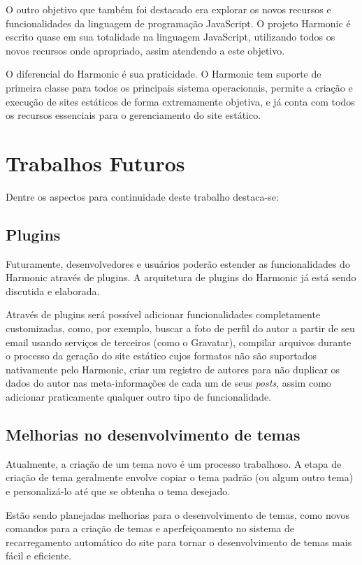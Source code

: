 \documentclass[ppginf, pep]{esinucpel}
\begin{document}
O outro objetivo que também foi destacado era explorar os novos recursos e funcionalidades da linguagem de programação JavaScript. O projeto Harmonic é escrito quase em sua totalidade na linguagem JavaScript, utilizando todos os novos recursos onde apropriado, assim atendendo a este objetivo.

O diferencial do Harmonic é sua praticidade. O Harmonic tem suporte de primeira classe para todos os principais sistema operacionais, permite a criação e execução de sites estáticos de forma extremamente objetiva, e já conta com todos os recursos essenciais para o gerenciamento do site estático.

\section{Trabalhos Futuros}

Dentre os aspectos para continuidade deste trabalho destaca-se: 

\subsection{Plugins}

Futuramente, desenvolvedores e usuários poderão estender as funcionalidades do Harmonic através de plugins. A arquitetura de plugins do Harmonic já está sendo discutida e elaborada.

Através de plugins será possível adicionar funcionalidades completamente customizadas, como, por exemplo, buscar a foto de perfil do autor a partir de seu email usando serviços de terceiros (como o Gravatar), compilar arquivos durante o processo da geração do site estático cujos formatos não são suportados nativamente pelo Harmonic, criar um registro de autores para não duplicar os dados do autor nas meta-informações de cada um de seus \textit{posts}, assim como adicionar praticamente qualquer outro tipo de funcionalidade.

\subsection{Melhorias no desenvolvimento de temas}

Atualmente, a criação de um tema novo é um processo trabalhoso. A etapa de criação de tema geralmente envolve copiar o tema padrão (ou algum outro tema) e personalizá-lo até que se obtenha o tema desejado.

Estão sendo planejadas melhorias para o desenvolvimento de temas, como novos comandos para a criação de temas e aperfeiçoamento no sistema de recarregamento automático do site para tornar o desenvolvimento de temas mais fácil e eficiente.
\end{document}
